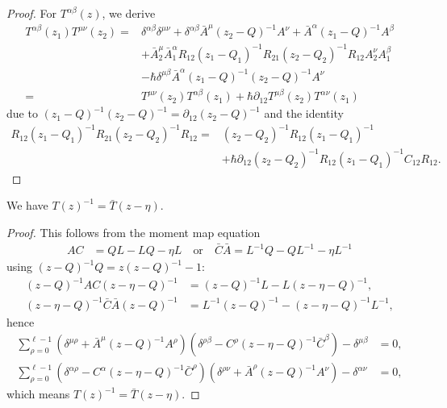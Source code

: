 \begin{proof}
For $T^{\alpha\beta}(z)$, we derive
\begin{align*}
T^{\alpha\beta}(z_1) T^{\mu\nu}(z_2)
={}& \delta^{\alpha\beta} \delta^{\mu\nu} + \delta^{\alpha\beta} \bar A^\mu (z_2-Q)^{-1} A^\nu + \bar A^\alpha (z_1-Q)^{-1} A^\beta \\
&+ \bar A_2^\mu \bar A_1^\alpha R_{12} (z_1-Q_1)^{-1} R_{21} (z_2-Q_2)^{-1} R_{12} A_2^\nu A_1^\beta \\
&- \hbar \delta^{\mu\beta} \bar A^\alpha (z_1-Q)^{-1} (z_2-Q)^{-1} A^\nu \\
={}& T^{\mu\nu}(z_2) T^{\alpha\beta}(z_1) + \hbar \partial_{12} T^{\mu\beta}(z_2) T^{\alpha\nu}(z_1)
\end{align*}
due to $(z_1-Q)^{-1} (z_2-Q)^{-1} = \partial_{12} (z_2-Q)^{-1}$ and the identity
\begin{align*}
R_{12} (z_1-Q_1)^{-1} R_{21} (z_2-Q_2)^{-1} R_{12} ={}& (z_2-Q_2)^{-1} R_{12} (z_1-Q_1)^{-1} \\
&+ \hbar \partial_{12}(z_2-Q_2)^{-1} R_{12} (z_1-Q_1)^{-1} C_{12} R_{12}.
\end{align*}
\end{proof}

\begin{prop}
We have $T(z)^{-1} = \bar{T}(z-\eta)$.
\end{prop}

\begin{proof}
This follows from the moment map equation
\begin{align*}
AC &= QL-LQ-\eta L \quad \text{or} \quad \bar C \bar A = L^{-1}Q-QL^{-1}-\eta L^{-1}
\end{align*}
using $(z-Q)^{-1} Q = z (z-Q)^{-1} - 1$:
\begin{align*}
(z-Q)^{-1} AC (z-\eta-Q)^{-1}
&= (z-Q)^{-1} L - L (z-\eta-Q)^{-1}, \\
(z-\eta-Q)^{-1} \bar C \bar A (z-Q)^{-1}
&= L^{-1} (z-Q)^{-1} - (z-\eta-Q)^{-1} L^{-1},
\end{align*}
hence
\begin{align*}
\sum_{\rho=0}^{\ell-1} (\delta^{\mu\rho} + \bar A^\mu (z-Q)^{-1} A^\rho) (\delta^{\rho\beta} - C^\rho (z-\eta-Q)^{-1} \bar C^\beta) - \delta^{\mu\beta}
&= 0, \\
\sum_{\rho=0}^{\ell-1} (\delta^{\alpha\rho} - C^\alpha (z-\eta-Q)^{-1} \bar C^\rho) (\delta^{\rho\nu} + \bar A^\rho (z-Q)^{-1} A^\nu) - \delta^{\alpha\nu}
&= 0,
\end{align*}
which means $T(z)^{-1} = \bar{T}(z-\eta)$.
\end{proof}

